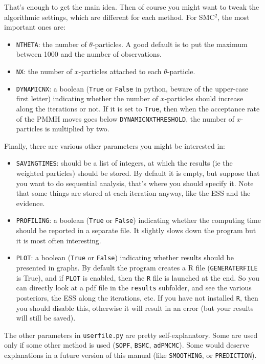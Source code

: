 \documentclass[a4paper,10pt]{paper}
\begin{document}
That's enough to get the main idea. Then of course you might want to tweak the algorithmic settings, which are different for each method.
For SMC$^2$, the most important ones are:
\begin{itemize}
 \item \texttt{NTHETA}: the number of $\theta$-particles. A good default is to put the maximum between 1000 and the number of observations.
 \item \texttt{NX}: the number of $x$-particles attached to each $\theta$-particle.
 \item \texttt{DYNAMICNX}: a boolean (\texttt{True} or \texttt{False} in python, beware of the upper-case first letter) indicating whether the number of $x$-particles should
increase along the iterations or not. If it is set to \texttt{True}, then when the acceptance rate of the PMMH moves goes below \texttt{DYNAMICNXTHRESHOLD}, the number
of $x$-particles is multiplied by two.
\end{itemize}

Finally, there are various other parameters you might be interested in:
\begin{itemize}
 \item \texttt{SAVINGTIMES}: should be a list of integers, at which the results (ie the weighted particles) should be stored. By default it is empty, but suppose
that you want to do sequential analysis, that's where you should specify it. Note that some things are stored at each iteration anyway, like the ESS and the evidence.
 \item \texttt{PROFILING}: a boolean (\texttt{True} or \texttt{False}) indicating whether the computing time should be reported in a separate file. It slightly slows down the program
but it is most often interesting.
 \item \texttt{PLOT}: a boolean (\texttt{True} or \texttt{False}) indicating whether results should be presented in graphs. By default the program creates a R file (\texttt{GENERATERFILE} is True),
and if \texttt{PLOT} is enabled, then the \texttt{R} file is launched at the end. So you can directly look at a pdf file in the \texttt{results} subfolder, and see the various posteriors, the ESS along the iterations, etc. If you have not installed \texttt{R}, then you should disable this, otherwise it will result in an error (but your results will still be saved).
\end{itemize}

The other parameters in \texttt{userfile.py} are pretty self-explanatory. Some are used only if some other method is used (\texttt{SOPF}, \texttt{BSMC}, \texttt{adPMCMC}).
Some would deserve explanations in a future version of this manual (like \texttt{SMOOTHING}, or \texttt{PREDICTION}).
\end{document}
